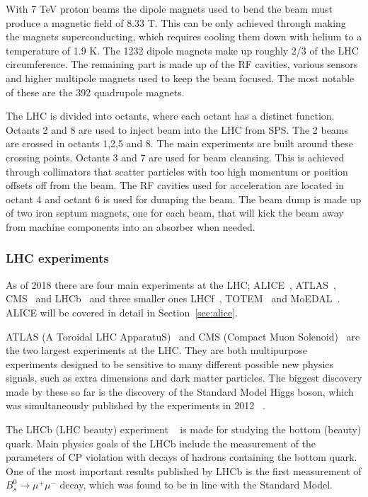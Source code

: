 With 7 TeV proton beams the dipole magnets used to bend the beam must produce a magnetic field of 8.33 T. This can be only achieved through making the magnets superconducting, which requires cooling them down with helium to a temperature of 1.9 K. The 1232 dipole magnets make up roughly 2/3 of the LHC circumference. The remaining part is made up of the RF cavities, various sensors and higher multipole magnets used to keep the beam focused. The most notable of these are the 392 quadrupole magnets.~\cite{Bruning:782076}

The LHC is divided into octants, where each octant has a distinct function. Octants 2 and 8 are used to inject beam into the LHC from SPS. The 2 beams are crossed in octants 1,2,5 and 8. The main experiments are built around these crossing points. Octants 3 and 7 are used for beam cleansing. This is achieved through collimators that scatter particles with too high momentum or position offsets off from the beam. The RF cavities used for acceleration are located in octant 4 and octant 6 is used for dumping the beam. The beam dump is made up of two iron septum magnets, one for each beam, that will kick the beam away from machine components into an absorber when needed. 


\subsubsection{LHC experiments}
As of 2018 there are four main experiments at the LHC; ALICE~\cite{aliceDetector}, ATLAS~\cite{Aad:2008zzm}, CMS~\cite{Chatrchyan:2008aa} and LHCb~\cite{Alves:2008zz} and three smaller ones LHCf~\cite{Adriani:2008zz}, TOTEM~\cite{Anelli:2008zza} and MoEDAL~\cite{MoEDAL:2016jlb}. ALICE will be covered in detail in Section~\ref{sec:alice}. 

ATLAS (A Toroidal LHC ApparatuS)~\cite{Aad:2008zzm} and CMS (Compact Muon Solenoid)~\cite{Chatrchyan:2008aa} are the two largest experiments at the LHC. They are both multipurpose experiments designed to be sensitive to many different possible new physics signals, such as extra dimensions and dark matter particles. The biggest discovery made by these so far is the discovery of the Standard Model Higgs boson, which was simultaneously published by the experiments in 2012 ~\cite{Aad:2012tfa, Chatrchyan:2012xdj}.

The LHCb (LHC beauty) experiment ~\cite{Alves:2008zz} is made for studying the bottom (beauty) quark. Main physics goals of the LHCb include the measurement of the parameters of CP violation with decays of hadrons containing the bottom quark. One of the most important results published by LHCb is the first measurement of $B_s^0\rightarrow \mu^+ \mu^-$ decay, which was found to be in line with the Standard Model.

